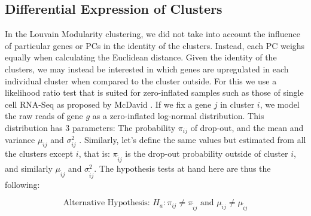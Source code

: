 \subsection{Differential Expression of Clusters}
In the Louvain Modularity clustering, we did not take into account the influence of particular genes or PCs in the identity of the clusters. Instead, each PC weighs equally when calculating the Euclidean distance. Given the identity of the clusters, we may instead be interested in which genes are upregulated in each individual cluster when compared to the cluster outside. For this we use a likelihood ratio test that is suited for zero-inflated samples such as those of single cell RNA-Seq as proposed by McDavid  \cite{mcdavid2013data}. If we fix a gene $j$ in cluster $i$, we model the raw reads of gene $g$ as a zero-inflated log-normal distribution. This distribution has 3 parameters: The probability $\pi_{ij}$ of drop-out, and the mean and variance $\mu_{ij}$  and $\sigma_{ij}^{2}$ . Similarly, let's define the same values but estimated from all the clusters except $i$, that is: $\pi_{\tilde{i}j}$ is the drop-out probability outside of cluster $i$, and similarly $\mu_{\tilde{i}j}$ and $\sigma_{\tilde{i}j}^2$. The hypothesis tests at hand here are thus the following:

$$
\mbox{Alternative Hypothesis: } H_a: \pi_{ij} \neq \pi_{\tilde{i}j} \mbox{ and } \mu_{ij} \neq \mu_{\tilde{i}j}
$$

